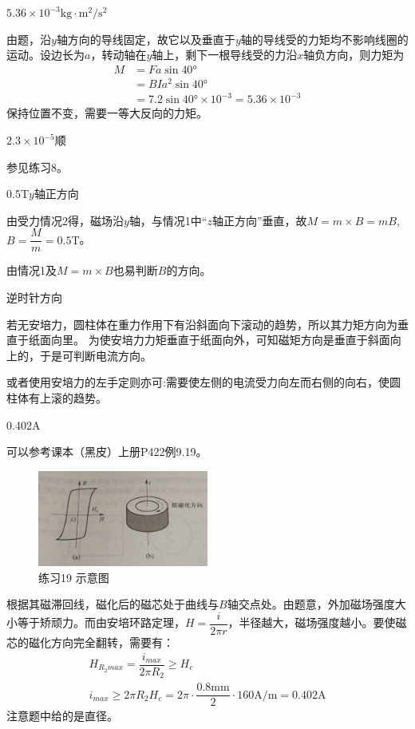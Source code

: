 \documentclass[b5paper,opensource,sourcefont,parskip]{qyxf-book}
\begin{document}
$5.36\times 10^{-3}\textrm{kg}\cdot \textrm{m}^2/\textrm{s}^2$

\solve
由题，沿$y$轴方向的导线固定，故它以及垂直于$y$轴的导线受的力矩均不影响线圈的运动。设边长为$a$，转动轴在$y$轴上，剩下一根导线受的力沿$x$轴负方向，则力矩为
\begin{align*}
	M&=Fa\sin \ang{40}\\
	&=BIa^2\sin \ang{40}\\
	&=7.2\sin \ang{40}\times 10^{-3}=5.36\times 10^{-3}
\end{align*}
保持位置不变，需要一等大反向的力矩。

$2.3\times 10^{-5}$\quad 顺
 
\solve
参见练习8。

0.5T\quad $y$轴正方向

\solve
由受力情况2得，磁场沿$y$轴，与情况1中“$z$轴正方向”垂直，故$M=m\times B=mB$,$B=
\dfrac{M}{m}=0.5\textrm{T}$。

由情况1及$M=m\times B$也易判断$B$的方向。

逆时针方向

\solve
若无安培力，圆柱体在重力作用下有沿斜面向下滚动的趋势，所以其力矩方向为垂直于纸面向里。
为使安培力力矩垂直于纸面向外，可知磁矩方向是垂直于斜面向上的，于是可判断电流方向。

或者使用安培力的左手定则亦可:需要使左侧的电流受力向左而右侧的向右，使圆柱体有上滚的趋势。

0.402A

\solve
可以参考课本（黑皮）上册\rm{P}422例9.19。
\begin{figure}[!h]	
	\centering	
	\includegraphics[width=0.5\textwidth]{Chp9_illus2.jpg}	
	\caption{练习19 示意图}
\end{figure}

根据其磁滞回线，磁化后的磁芯处于曲线与$B$轴交点处。由题意，外加磁场强度大小等于矫顽力。而由安培环路定理，$H=\dfrac{i}{2\pi r}$，半径越大，磁场强度越小。要使磁芯的磁化方向完全翻转，需要有：
\begin{gather*}
	H_{R_2max}=\dfrac{i_{max}}{2\pi R_2}\geqslant H_c\\
	i_{max}\geqslant 2\pi R_2H_c=2\pi\cdot \dfrac{0.8\textrm{mm}}{2} \cdot 160\textrm{A/m}=0.402\textrm{A}
\end{gather*}
注意题中给的是直径。
\end{document}
